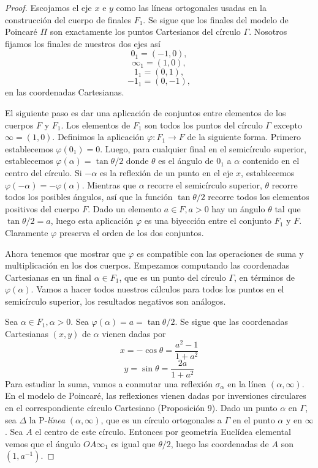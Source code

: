 \documentclass[a4paper]{amsart}
\theoremstyle{plain}
\begin{document}
\begin{proof}
Escojamos el eje $x$ e $y$ como las líneas ortogonales usadas en la construcción del cuerpo de finales $F_1$. Se sigue que los finales del modelo de Poincaré $\Pi$ son exactamente los puntos Cartesianos del círculo $\Gamma$. Nosotros fijamos los finales de nuestros dos ejes así
\[
0_1=(-1,0),
\]
\[
\infty_1=(1,0),
\]
\[
1_1=(0,1),
\]
\[
-1_1=(0,-1),
\]
en las coordenadas Cartesianas.

El siguiente paso es dar una aplicación de conjuntos entre elementos de los cuerpos $F$ y $F_1$. Los elementos de $F_1$ son todos los puntos del círculo $\Gamma$ excepto $\infty=(1,0)$. Definimos la aplicación $\varphi:F_1\rightarrow F$ de la siguiente forma. Primero establecemos $\varphi (0_1)=0$. Luego, para cualquier final en el semicírculo superior, establecemos $\varphi(\alpha)=\tan\theta/2$ donde $\theta$ es el ángulo de $0_1$ a $\alpha$ contenido en el centro del círculo. Si $-\alpha$ es la reflexión de un punto en el eje $x$, establecemos $\varphi(-\alpha)=-\varphi(\alpha)$. Mientras que $\alpha$ recorre el semicírculo superior, $\theta$ recorre todos los posibles ángulos, así que la función $\tan \theta/2$ recorre todos los elementos positivos del cuerpo $F$. Dado un elemento $a\in F,a>0$ hay un ángulo $\theta$ tal que $\tan\theta/2=a$, luego esta aplicación $\varphi$ es una biyección entre el conjunto $F_1$ y $F$. Claramente $\varphi$ preserva el orden de los dos conjuntos.

Ahora tenemos que mostrar que $\varphi$ es compatible con las operaciones de suma y multiplicación en los dos cuerpos. Empezamos computando las coordenadas Cartesianas en un final $\alpha\in F_1$, que es un punto del círculo $\Gamma$, en términos de $\varphi(\alpha)$. Vamos a hacer todos nuestros cálculos para todos los puntos en el semicírculo superior, los resultados negativos son análogos.

Sea $\alpha\in F_1, \alpha>0$. Sea $\varphi(\alpha)=a=\tan\theta/2$. Se sigue que las coordenadas Cartesianas $(x,y)$ de $\alpha$ vienen dadas por
\[
x=-\cos \theta=\frac{a^2-1}{1+a^2}
\]
\[
y=\sin\theta=\frac{2a}{1+a^2}
\]
Para estudiar la suma, vamos a conmutar una reflexión $\sigma_{\alpha}$ en la línea $(\alpha,\infty)$. En el modelo de Poincaré, las reflexiones vienen dadas por inversiones circulares en el correspondiente círculo Cartesiano (Proposición 9). Dado un punto $\alpha$ en $\Gamma$, sea $\Delta$ la P-\textit{línea} $(\alpha,\infty)$, que es un círculo ortogonales a $\Gamma$ en el punto $\alpha$ y en $\infty$. Sea $A$ el centro de este círculo. Entonces por geometría Euclídea elemental vemos que el ángulo $OA\infty_1$ es igual que $\theta/2$, luego las coordenadas de $A$ son $(1,a^{-1})$.


\end{proof}
\end{document}
